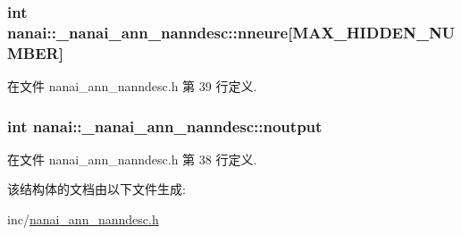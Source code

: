 \subsubsection[{nneure}]{\setlength{\rightskip}{0pt plus 5cm}int nanai\+::\+\_\+nanai\+\_\+ann\+\_\+nanndesc\+::nneure\mbox{[}{\bf M\+A\+X\+\_\+\+H\+I\+D\+D\+E\+N\+\_\+\+N\+U\+M\+B\+E\+R}\mbox{]}}\label{structnanai_1_1__nanai__ann__nanndesc_a62b3366bcb4042255717c4cfb6b604c4}


在文件 nanai\+\_\+ann\+\_\+nanndesc.\+h 第 39 行定义.

\hypertarget{structnanai_1_1__nanai__ann__nanndesc_a769462fc48b0adcf72ee32c9f8026735}{}
\subsubsection[{noutput}]{\setlength{\rightskip}{0pt plus 5cm}int nanai\+::\+\_\+nanai\+\_\+ann\+\_\+nanndesc\+::noutput}\label{structnanai_1_1__nanai__ann__nanndesc_a769462fc48b0adcf72ee32c9f8026735}


在文件 nanai\+\_\+ann\+\_\+nanndesc.\+h 第 38 行定义.



该结构体的文档由以下文件生成\+:\begin{DoxyCompactItemize}
\item 
inc/\hyperlink{nanai__ann__nanndesc_8h}{nanai\+\_\+ann\+\_\+nanndesc.\+h}\end{DoxyCompactItemize}
